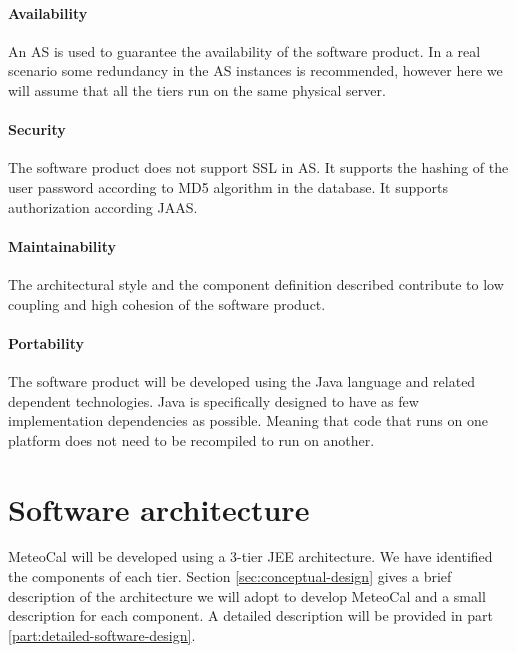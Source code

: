 \documentclass[10pt,a4paper,titlepage]{article}
\begin{document}
\subsection{Availability}
An AS is used to guarantee the availability of the software product. In a real scenario some redundancy in the AS instances is recommended, however here we will assume that all the tiers run on the same physical server.

\subsection{Security}
The software product does not support SSL in AS. It supports the hashing of the user password according to MD5 algorithm in the database. It supports authorization according JAAS.

\subsection{Maintainability}
The architectural style and the component definition described contribute to low coupling and high cohesion of the software product.

\subsection{Portability}
The software product will be developed using the Java language and related dependent technologies. Java is specifically designed to have as few implementation dependencies as possible. Meaning that code that runs on one platform does not need to be recompiled to run on another.

\clearpage
\part{Software architecture}
\label{part:software-architecture}
MeteoCal will be developed using a 3-tier JEE architecture. We have identified the components of each tier. Section \ref{sec:conceptual-design} gives a brief description of the architecture we will adopt to develop MeteoCal and a small description for each component. A detailed description will be provided in part \ref{part:detailed-software-design}.
\end{document}
